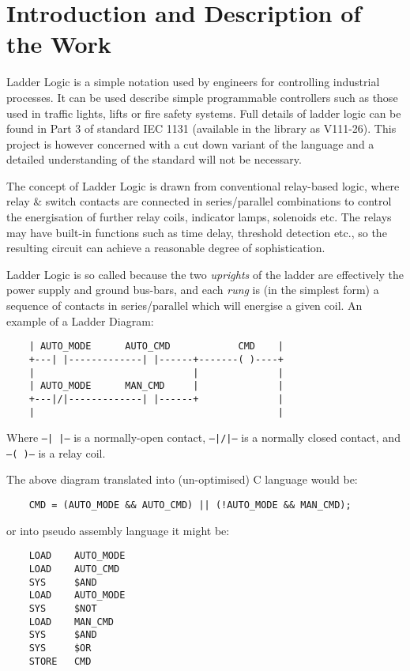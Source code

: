 \documentclass[12pt]{article}
\begin{document}
\section*{Introduction and Description of the Work}

Ladder Logic is a simple notation used by engineers for controlling
industrial processes. It can be used describe simple programmable
controllers such as those used in traffic lights, lifts or fire safety
systems. Full details of ladder logic can be found in Part 3 of
standard IEC 1131 (available in the library as V111-26).  This project
is however concerned with a cut down variant of the language and a
detailed understanding of the standard will not be necessary.

The concept of Ladder Logic is drawn from conventional relay-based
logic, where relay \& switch contacts are connected in series/parallel
combinations to control the energisation of further relay coils,
indicator lamps, solenoids etc. The relays may have built-in functions
such as time delay, threshold detection etc., so the resulting circuit
can achieve a reasonable degree of sophistication.

Ladder Logic is so called because the two \emph{uprights\/} of the
ladder are effectively the power supply and ground bus-bars, and each
\emph{rung\/} is (in the simplest form) a sequence of contacts in
series/parallel which will energise a given coil. An example of a
Ladder Diagram:

\begin{verbatim}
    | AUTO_MODE      AUTO_CMD            CMD    |
    +---| |-------------| |------+-------( )----+
    |                            |              |
    | AUTO_MODE      MAN_CMD     |              |
    +---|/|-------------| |------+              |
    |                                           |
\end{verbatim}

Where {\tt --| |--} is a normally-open contact, {\tt --|/|--} is a
normally closed contact, and {\tt --(~)--} is a relay coil.

The above diagram translated into (un-optimised) C language would be:

\begin{verbatim}
    CMD = (AUTO_MODE && AUTO_CMD) || (!AUTO_MODE && MAN_CMD);
\end{verbatim}

or into pseudo assembly language it might be:

\begin{verbatim}
    LOAD    AUTO_MODE
    LOAD    AUTO_CMD
    SYS     $AND
    LOAD    AUTO_MODE
    SYS     $NOT
    LOAD    MAN_CMD
    SYS     $AND
    SYS     $OR
    STORE   CMD
\end{verbatim}
\end{document}
